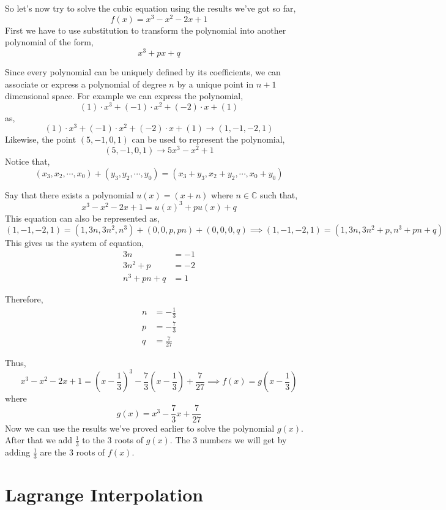 \documentclass[11pt,numbers=noenddot,svgnames]{scrbook}
\begin{document}
So let's now try to solve the cubic equation using the results we've got so far,
\[
    f(x) = x^{3} - x^{2} - 2x + 1
\]
First we have to use substitution to transform the polynomial into another polynomial of the form,
\[
    x^{3} + px + q
\]

Since every polynomial can be uniquely defined by its coefficients, we can associate or 
express a polynomial of degree $n$ by a unique point in $n+1$ dimensional space. 
For example we can express the polynomial,
\[
    (1) \cdot x^{3} + (-1) \cdot x^{2} + (-2) \cdot x + (1)
\]
as,
\[
    (1) \cdot x^{3} + (-1) \cdot x^{2} + (-2) \cdot x + (1) \rightarrow (1, -1, -2, 1)
\]
Likewise, the point $(5, -1, 0, 1)$ can be used to represent the polynomial,
\[
    (5, -1, 0, 1) \rightarrow 5x^{3} -x^{2} + 1
\]
Notice that,
\[
    (x_{3}, x_{2}, \cdots, x_{0}) + (y_{3}, y_{2}, \cdots, y_{0}) = (x_{3} + y_{3}, x_{2} + y_{2}, \cdots, x_{0} + y_{0})
\]

Say that there exists a polynomial $u(x) = (x+n)$ where $n \in \mathbb{C}$ such that,
\[
    x^{3} - x^{2} -2x + 1 = u(x)^{3} + pu(x) + q
\]
This equation can also be represented as,
\[
    (1, -1, -2, 1) = (1, 3n, 3n^{2}, n^{3}) + (0, 0, p, pn) + (0,0,0,q) \implies (1, -1, -2, 1) = (1, 3n, 3n^{2}+p, n^{3}+ pn + q)
\]
This gives us the system of equation,
\begin{align*}
   3n              &= -1 \\
   3n^{2} + p      &= -2 \\
    n^{3} + pn + q &= 1
\end{align*}

Therefore,
\begin{align*}
   n &= -\frac{1}{3} \\
   p &= -\frac{7}{3}\\
   q &=  \frac{7}{27}
\end{align*}

Thus,
\[
    x^{3} - x^{2} -2x +1 = \left(x - \frac{1}{3}\right)^{3} -\frac{7}{3}\left(x - \frac{1}{3}\right) +\frac{7}{27} \implies f(x) = g\left(x - \frac{1}{3}\right)
\]
where \[ g(x) = x^{3} - \frac{7}{3}x + \frac{7}{27} \]
Now we can use the results we've proved earlier to solve the polynomial $g(x)$. After that we add $\frac{1}{3}$ to the 3 roots 
of $g(x)$. The 3 numbers we will get by adding $\frac{1}{3}$ are the 3 roots of $f(x)$.

\section{Lagrange Interpolation}
\end{document}
